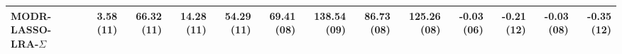 \begin{tabular}{lrrrrrrrrrrrr}
MODR-LASSO-LRA-$\Sigma$ & {\cellcolor[HTML]{D6A5A5}} \color[HTML]{000000} 3.58 (11) & {\cellcolor[HTML]{CF6969}} \color[HTML]{F1F1F1} 66.32 (11) & {\cellcolor[HTML]{D18181}} \color[HTML]{F1F1F1} 14.28 (11) & {\cellcolor[HTML]{CE6767}} \color[HTML]{F1F1F1} 54.29 (11) & {\cellcolor[HTML]{D9C0C0}} \color[HTML]{000000} 69.41 (08) & {\cellcolor[HTML]{DBD4D4}} \color[HTML]{000000} 138.54 (09) & {\cellcolor[HTML]{D9BFBF}} \color[HTML]{000000} 86.73 (08) & {\cellcolor[HTML]{DCD9D9}} \color[HTML]{000000} 125.26 (08) & {\cellcolor[HTML]{379797}} \color[HTML]{F1F1F1} -0.03 (06) & {\cellcolor[HTML]{D59D9D}} \color[HTML]{F1F1F1} -0.21 (12) & {\cellcolor[HTML]{DBD2D2}} \color[HTML]{000000} -0.03 (08) & {\cellcolor[HTML]{DAC7C7}} \color[HTML]{000000} -0.35 (12) \\
\bottomrule
\end{tabular}
